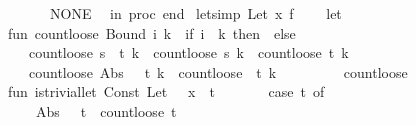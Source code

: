 \begin{isabellebody}
\ \ \ \ \ \ \ {\isacharbar}{\kern0pt}\ {\isacharunderscore}{\kern0pt}\ {\isacharequal}{\kern0pt}{\isachargreater}{\kern0pt}\ NONE{\isacharparenright}{\kern0pt}{\isacharsemicolon}{\kern0pt}\isanewline
\ \ in\ proc\ end\isanewline
{\isacartoucheclose}\isanewline
\isanewline
{}\isamarkupfalse%
\ let{\isacharunderscore}{\kern0pt}simp\ {\isacharparenleft}{\kern0pt}{\isachardoublequoteopen}Let\ x\ f{\isachardoublequoteclose}{\isacharparenright}{\kern0pt}\ {\isacharequal}{\kern0pt}\ {\isacartoucheopen}\isanewline
\ \ let\isanewline
\ \ \ \ fun\ count{\isacharunderscore}{\kern0pt}loose\ {\isacharparenleft}{\kern0pt}Bound\ i{\isacharparenright}{\kern0pt}\ k\ {\isacharequal}{\kern0pt}\ if\ i\ {\isachargreater}{\kern0pt}{\isacharequal}{\kern0pt}\ k\ then\ {}\ else\ {}\isanewline
\ \ \ \ \ \ {\isacharbar}{\kern0pt}\ count{\isacharunderscore}{\kern0pt}loose\ {\isacharparenleft}{\kern0pt}s\ {\isachardollar}{\kern0pt}\ t{\isacharparenright}{\kern0pt}\ k\ {\isacharequal}{\kern0pt}\ count{\isacharunderscore}{\kern0pt}loose\ s\ k\ {\isacharplus}{\kern0pt}\ count{\isacharunderscore}{\kern0pt}loose\ t\ k\isanewline
\ \ \ \ \ \ {\isacharbar}{\kern0pt}\ count{\isacharunderscore}{\kern0pt}loose\ {\isacharparenleft}{\kern0pt}Abs\ {\isacharparenleft}{\kern0pt}{\isacharunderscore}{\kern0pt}{\isacharcomma}{\kern0pt}\ {\isacharunderscore}{\kern0pt}{\isacharcomma}{\kern0pt}\ t{\isacharparenright}{\kern0pt}{\isacharparenright}{\kern0pt}\ k\ {\isacharequal}{\kern0pt}\ count{\isacharunderscore}{\kern0pt}loose\ \ t\ {\isacharparenleft}{\kern0pt}k\ {\isacharplus}{\kern0pt}\ {}{\isacharparenright}{\kern0pt}\isanewline
\ \ \ \ \ \ {\isacharbar}{\kern0pt}\ count{\isacharunderscore}{\kern0pt}loose\ {\isacharunderscore}{\kern0pt}\ {\isacharunderscore}{\kern0pt}\ {\isacharequal}{\kern0pt}\ {}{\isacharsemicolon}{\kern0pt}\isanewline
\ \ \ \ fun\ is{\isacharunderscore}{\kern0pt}trivial{\isacharunderscore}{\kern0pt}let\ {\isacharparenleft}{\kern0pt}Const\ {\isacharparenleft}{\kern0pt}\isactrlconstUNDERSCOREname {\isasymopen}Let{\isasymclose}{\isacharcomma}{\kern0pt}\ {\isacharunderscore}{\kern0pt}{\isacharparenright}{\kern0pt}\ {\isachardollar}{\kern0pt}\ x\ {\isachardollar}{\kern0pt}\ t{\isacharparenright}{\kern0pt}\ {\isacharequal}{\kern0pt}\isanewline
\ \ \ \ \ \ {\isacharparenleft}{\kern0pt}case\ t\ of\isanewline
\ \ \ \ \ \ \ \ Abs\ {\isacharparenleft}{\kern0pt}{\isacharunderscore}{\kern0pt}{\isacharcomma}{\kern0pt}\ {\isacharunderscore}{\kern0pt}{\isacharcomma}{\kern0pt}\ t{\isacharprime}{\kern0pt}{\isacharparenright}{\kern0pt}\ {\isacharequal}{\kern0pt}{\isachargreater}{\kern0pt}\ count{\isacharunderscore}{\kern0pt}loose\ t{\isacharprime}{\kern0pt}\ {}\ {\isacharless}{\kern0pt}{\isacharequal}{\kern0pt}\ {}\isanewline

\end{isabellebody}
